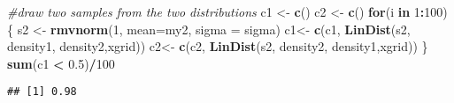 \documentclass[]{article}
\newenvironment{Shaded}{\begin{snugshade}}{\end{snugshade}}
\newcommand{\CommentTok}[1]{\textcolor[rgb]{0.56,0.35,0.01}{\textit{#1}}}
\newcommand{\ControlFlowTok}[1]{\textcolor[rgb]{0.13,0.29,0.53}{\textbf{#1}}}
\newcommand{\DataTypeTok}[1]{\textcolor[rgb]{0.13,0.29,0.53}{#1}}
\newcommand{\DecValTok}[1]{\textcolor[rgb]{0.00,0.00,0.81}{#1}}
\newcommand{\FloatTok}[1]{\textcolor[rgb]{0.00,0.00,0.81}{#1}}
\newcommand{\KeywordTok}[1]{\textcolor[rgb]{0.13,0.29,0.53}{\textbf{#1}}}
\newcommand{\NormalTok}[1]{#1}
\newcommand{\OperatorTok}[1]{\textcolor[rgb]{0.81,0.36,0.00}{\textbf{#1}}}
\newcommand{\StringTok}[1]{\textcolor[rgb]{0.31,0.60,0.02}{#1}}
\begin{document}
\begin{Shaded}
\begin{Highlighting}[]
\CommentTok{#draw two samples from the two distributions}
\NormalTok{c1 <-}\StringTok{ }\KeywordTok{c}\NormalTok{()}
\NormalTok{c2 <-}\StringTok{ }\KeywordTok{c}\NormalTok{()}
\ControlFlowTok{for}\NormalTok{(i }\ControlFlowTok{in} \DecValTok{1}\OperatorTok{:}\DecValTok{100}\NormalTok{)}
\NormalTok{\{}
\NormalTok{  s2 <-}\StringTok{ }\KeywordTok{rmvnorm}\NormalTok{(}\DecValTok{1}\NormalTok{, }\DataTypeTok{mean=}\NormalTok{my2, }\DataTypeTok{sigma =}\NormalTok{ sigma)}
\NormalTok{  c1<-}\StringTok{ }\KeywordTok{c}\NormalTok{(c1, }\KeywordTok{LinDist}\NormalTok{(s2, density1, density2,xgrid))}
\NormalTok{  c2<-}\StringTok{ }\KeywordTok{c}\NormalTok{(c2, }\KeywordTok{LinDist}\NormalTok{(s2, density2, density1,xgrid))}
\NormalTok{\}}
\KeywordTok{sum}\NormalTok{(c1 }\OperatorTok{<}\StringTok{ }\FloatTok{0.5}\NormalTok{)}\OperatorTok{/}\DecValTok{100}
\end{Highlighting}
\end{Shaded}

\begin{verbatim}
## [1] 0.98
\end{verbatim}
\end{document}
